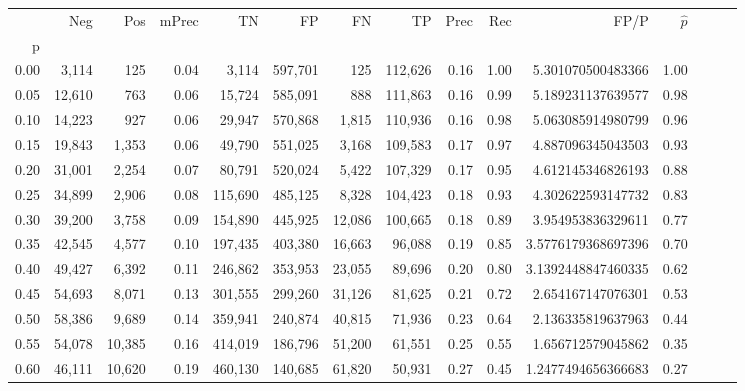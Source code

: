 \begin{tabular}{rrrrrrrrrrrrrrr}
\toprule
{} &     Neg &     Pos & mPrec &       TN &       FP &       FN &       TP &  Prec &   Rec &                  FP/P & $\hat{p}$ \\
p    &         &         &       &          &          &          &          &       &       &                       &           \\
\midrule
0.00 &   3,114 &     125 &  0.04 &    3,114 &  597,701 &      125 &  112,626 &  0.16 &  1.00 &     5.301070500483366 &      1.00 \\
0.05 &  12,610 &     763 &  0.06 &   15,724 &  585,091 &      888 &  111,863 &  0.16 &  0.99 &     5.189231137639577 &      0.98 \\
0.10 &  14,223 &     927 &  0.06 &   29,947 &  570,868 &    1,815 &  110,936 &  0.16 &  0.98 &     5.063085914980799 &      0.96 \\
0.15 &  19,843 &   1,353 &  0.06 &   49,790 &  551,025 &    3,168 &  109,583 &  0.17 &  0.97 &     4.887096345043503 &      0.93 \\
0.20 &  31,001 &   2,254 &  0.07 &   80,791 &  520,024 &    5,422 &  107,329 &  0.17 &  0.95 &     4.612145346826193 &      0.88 \\
0.25 &  34,899 &   2,906 &  0.08 &  115,690 &  485,125 &    8,328 &  104,423 &  0.18 &  0.93 &     4.302622593147732 &      0.83 \\
0.30 &  39,200 &   3,758 &  0.09 &  154,890 &  445,925 &   12,086 &  100,665 &  0.18 &  0.89 &     3.954953836329611 &      0.77 \\
0.35 &  42,545 &   4,577 &  0.10 &  197,435 &  403,380 &   16,663 &   96,088 &  0.19 &  0.85 &    3.5776179368697396 &      0.70 \\
0.40 &  49,427 &   6,392 &  0.11 &  246,862 &  353,953 &   23,055 &   89,696 &  0.20 &  0.80 &    3.1392448847460335 &      0.62 \\
0.45 &  54,693 &   8,071 &  0.13 &  301,555 &  299,260 &   31,126 &   81,625 &  0.21 &  0.72 &     2.654167147076301 &      0.53 \\
0.50 &  58,386 &   9,689 &  0.14 &  359,941 &  240,874 &   40,815 &   71,936 &  0.23 &  0.64 &     2.136335819637963 &      0.44 \\
0.55 &  54,078 &  10,385 &  0.16 &  414,019 &  186,796 &   51,200 &   61,551 &  0.25 &  0.55 &     1.656712579045862 &      0.35 \\
0.60 &  46,111 &  10,620 &  0.19 &  460,130 &  140,685 &   61,820 &   50,931 &  0.27 &  0.45 &    1.2477494656366683 &      0.27 \\

\end{tabular}
